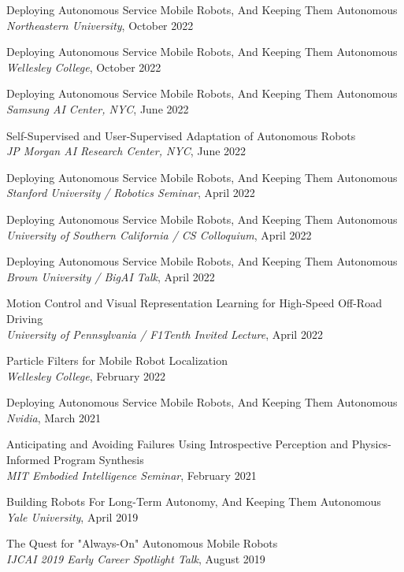 \documentclass[Times]{article}
\begin{document}
Deploying Autonomous Service Mobile Robots, And Keeping Them Autonomous
\\
{\em Northeastern University}, October 2022

Deploying Autonomous Service Mobile Robots, And Keeping Them Autonomous
\\
{\em Wellesley College}, October 2022

Deploying Autonomous Service Mobile Robots, And Keeping Them Autonomous
\\
{\em Samsung AI Center, NYC}, June 2022

Self-Supervised and User-Supervised Adaptation of Autonomous Robots
\\
{\em JP Morgan AI Research Center, NYC}, June 2022

Deploying Autonomous Service Mobile Robots, And Keeping Them Autonomous
\\
{\em Stanford University / Robotics Seminar}, April 2022

Deploying Autonomous Service Mobile Robots, And Keeping Them Autonomous
\\
{\em University of Southern California / CS Colloquium}, April 2022

Deploying Autonomous Service Mobile Robots, And Keeping Them Autonomous
\\
{\em Brown University / BigAI Talk}, April 2022

Motion Control and Visual Representation Learning for High-Speed Off-Road Driving
\\
{\em University of Pennsylvania / F1Tenth Invited Lecture}, April 2022

Particle Filters for Mobile Robot Localization
\\
{\em Wellesley College}, February 2022

Deploying Autonomous Service Mobile Robots, And Keeping Them Autonomous
\\
{\em Nvidia}, March 2021

Anticipating and Avoiding Failures Using Introspective Perception and Physics-Informed Program Synthesis\\
{\em MIT Embodied Intelligence Seminar}, February 2021

Building Robots For Long-Term Autonomy, And Keeping Them Autonomous\\
{\em Yale University}, April 2019

The Quest for "Always-On" Autonomous Mobile Robots\\
{\em IJCAI 2019 Early Career Spotlight Talk}, August 2019
\end{document}
